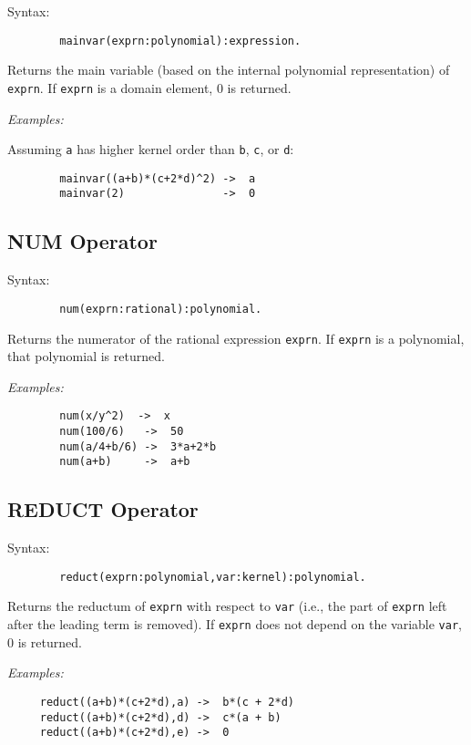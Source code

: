 Syntax:
\begin{verbatim}
        mainvar(exprn:polynomial):expression.
\end{verbatim}
Returns the main variable (based on the internal polynomial representation)
of \texttt{exprn}. If \texttt{exprn} is a domain element, 0 is returned.

\textit{Examples:}

Assuming \texttt{a} has higher kernel order than \texttt{b}, \texttt{c}, or \texttt{d}:
\begin{verbatim}
        mainvar((a+b)*(c+2*d)^2) ->  a
        mainvar(2)               ->  0
\end{verbatim}

\subsection{NUM Operator}
\hypertarget{operator:NUM}{}

Syntax:
\begin{verbatim}
        num(exprn:rational):polynomial.
\end{verbatim}
Returns the numerator of the rational expression \texttt{exprn}.  If \texttt{exprn}
is a polynomial, that polynomial is returned.

\textit{Examples:}
\begin{verbatim}
        num(x/y^2)  ->  x
        num(100/6)   ->  50
        num(a/4+b/6) ->  3*a+2*b
        num(a+b)     ->  a+b
\end{verbatim}

\subsection{REDUCT Operator}
\hypertarget{operator:REDUCT}{}

Syntax:
\begin{verbatim}
        reduct(exprn:polynomial,var:kernel):polynomial.
\end{verbatim}
Returns the reductum of \texttt{exprn} with respect to \texttt{var} (i.e., the
part of \texttt{exprn} left after the leading term is removed).  If \texttt{exprn}
does not depend on the variable \texttt{var}, 0 is returned.

\textit{Examples:}
\begin{verbatim}
     reduct((a+b)*(c+2*d),a) ->  b*(c + 2*d)
     reduct((a+b)*(c+2*d),d) ->  c*(a + b)
     reduct((a+b)*(c+2*d),e) ->  0
\end{verbatim}

